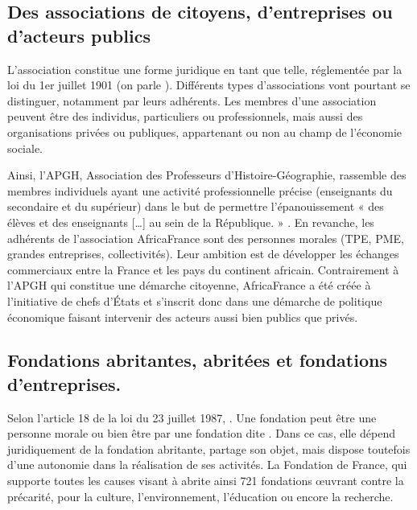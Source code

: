     \subsection{Des associations de citoyens, d’entreprises ou d’acteurs publics}
        L’association constitue une forme juridique en tant que telle, réglementée par la loi du 1er juillet 1901 (on parle ). Différents types d’associations vont pourtant se distinguer, notamment par leurs adhérents. Les membres d’une association peuvent être des individus, particuliers ou professionnels, mais aussi des organisations privées ou publiques, appartenant ou non au champ de l’économie sociale.

        Ainsi, l’APGH, Association des Professeurs d’Histoire-Géographie, rassemble des membres individuels ayant une activité professionnelle précise (enseignants du secondaire et du supérieur) dans le but de permettre l’épanouissement « des élèves et des enseignants […] au sein de la République. » . En revanche, les adhérents de l’association AfricaFrance  sont des personnes morales (TPE, PME, grandes entreprises, collectivités). Leur ambition est de développer les échanges commerciaux entre la France et les pays du continent africain.  Contrairement à l’APGH qui constitue une démarche citoyenne, AfricaFrance a été créée à l’initiative de chefs d’États et s’inscrit donc dans une démarche de politique économique faisant intervenir des acteurs aussi bien publics que privés.

    \subsection{Fondations abritantes, abritées et fondations d’entreprises. }
        Selon l’article 18 de la loi du 23 juillet 1987, . Une fondation peut être une personne morale ou bien être  par une fondation dite   . Dans ce cas, elle dépend juridiquement de la fondation abritante, partage son objet, mais dispose toutefois d’une autonomie dans la réalisation de ses activités. La Fondation de France, qui supporte toutes les causes visant à   abrite ainsi 721 fondations œuvrant contre la précarité, pour la culture, l’environnement, l’éducation ou encore la recherche.


